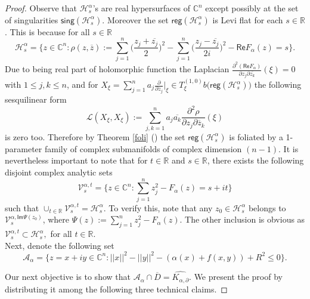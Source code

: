 \documentclass[12pt,reqno, a4paper]{amsart}
\theoremstyle{definition}
\theoremstyle{definition}
\numberwithin{equation}{section}
\def\R{\mathbb{R}}                              %
\def\C{\mathbb{C}}                              %
\begin{document}
\begin{proof}
Observe that $\mathcal{H}_{s}^{\alpha}$'s are real hypersurfaces of $\C^n$ except possibly at the set of singularities $\textsf{sing}(\mathcal{H}_{s}^{\alpha})$. Moreover the set $\textsf{reg}(\mathcal{H}_{s}^{\alpha})$  is Levi flat for each $s\in \R$. This is because for all $s \in \R$ 
 $$\mathcal{H}_s^{\alpha}=\Big\{z\in\C^{n}: \rho(z,\overline{z}):=\sum_{j=1}^{n}\Big(\frac{z_j+\overline{z_j}}{2}\Big)^2-\sum_{j=1}^{n}\Big(\frac{z_j-\overline{z_j}}{2i}\Big)^2-\textsf{Re}F_{\alpha}(z)=s\Big\}.$$
Due to being real part of holomorphic function the Laplacian  $\frac{\partial^2(\textsf{Re}F_{\alpha})}{\partial z_j\partial \overline{z_k}}(\xi)=0$ with $1\leq j,k\leq n$, and for $X_{\xi}=\sum_{j =1}^{n} a_j \frac{\partial}{\partial z_j}\Big\rvert_{\xi} \in T_{\xi}^{(1,0)}b \big(\textsf{reg}(\mathcal{H}_s^{\alpha})\big)$ the following sesquilinear form $$\mathcal{L}(X_{\xi}, X_{\xi}):=\sum \limits_{j,k =1}^{n} {a_j}\overline{a_k} \frac{\partial^2\rho}{\partial {z_j}\partial \overline{z}_k} (\xi)$$ is zero too. Therefore by Theorem \ref{foli} (\cite{bogg}) the set $\textsf{reg}(\mathcal{H}_s^{\alpha})$
is foliated by a {1-parameter} family of complex submanifolds of complex dimension $(n-1)$. It is nevertheless important to note that for $t\in \R$ and $s\in \R$, there exists the following disjoint complex analytic sets
\begin{equation}\label{comp_ana_sets}
\mathcal{V}_{{s}}^{\alpha,t}=\{z\in \C^n: \sum\limits_{j=1}^{n}z_j^2-F_{\alpha}(z)=s+it\}
\end{equation}
such that $\cup_{t\in \R}{}\mathcal{V}_{{s}}^{\alpha,t}=\mathcal{H}_{{s}}^{\alpha}.$ To verify this, note that any $z_0\in \mathcal{H}_{s}^{\alpha}$ belongs to $\mathcal{V}_{s}^{\alpha,\textsf{Im}\Psi(z_0)}$, where $\Psi(z):=\sum_{j=1}^{n}z_j^2-F_{\alpha}(z).$ The other inclusion is obvious as $\mathcal{V}_{s}^{\alpha,t} \subset \mathcal{H}_{s}^{\alpha},$ for all $t\in \R.$\\

Next, denote the following set $$\mathcal{A}_{\alpha}=\{z=x+iy\in \C^n: ||x||^2-||y||^2-(\alpha(x)+f(x,y))+R^2\leq 0\}.$$


Our next objective is to show that $\mathcal{A}_{\alpha} \cap \overline{D} =\widehat{K_{\alpha,\partial}}.$ 
We present the proof by distributing it among the following three technical claims.


\end{proof}
\end{document}
